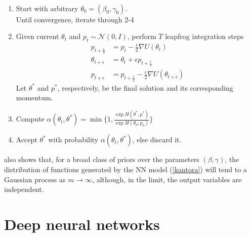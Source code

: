 {\tt 
\begin{enumerate}
  \item  Start with arbitrary $\theta_0 = (\beta _0, \gamma _0)$.\\
    Until convergence, iterate through 2-4
  \item  Given current $\theta_t$ and $p_t \sim \mathcal{N}(0, I)$, perform $T$ leapfrog integration
  steps 
  \begin{align*}
  p_{t + \frac{\epsilon}{2}} &= p_t - \frac{\epsilon}{2}\nabla U(\theta_t) \\
   \theta_{t+ \epsilon} &= \theta_t + \epsilon  p_{t + \frac{\epsilon}{2}} \\
   p_{t + \epsilon} &= p_{t + \frac{\epsilon}{2}} - \frac{\epsilon}{2}\nabla U(\theta_{t+ \epsilon})
    \end{align*}
    Let $\theta^*$ and $p^*$, respectively,
    be the final solution 
    and its corresponding momentum.
\item Compute $\alpha(\theta_t, \theta^*) = \min \lbrace 1, \frac{\exp H(\theta^*, p^*)}{\exp H(\theta_0, p_0)} \rbrace$
\item Accept $\theta^*$ with probability $\alpha(\theta_t, \theta^*)$, else discard it.
    \end{enumerate}
}
\noindent \cite{neal2012bayesian} also shows that,
for a broad class of priors over the parameters 
$(\beta ,\gamma )$, the distribution of functions
generated by the NN model (\ref{kantora})
will tend to a Gaussian
process as  $m\rightarrow \infty$, although, in
the limit, the output variables are independent.

\section{Deep neural networks}

